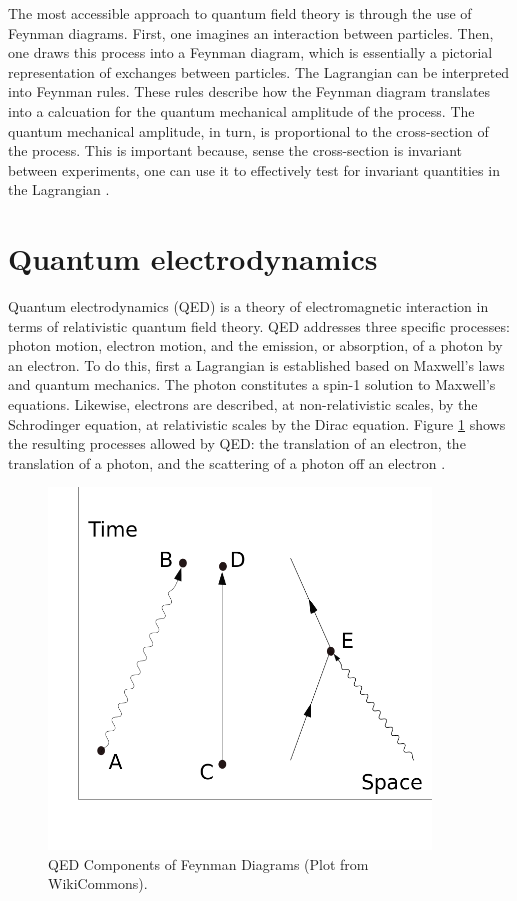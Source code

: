 The most accessible approach to quantum field theory is through the use of Feynman diagrams. First, one imagines an interaction between particles. Then, one draws this process into a Feynman diagram, which is essentially a pictorial representation of exchanges between particles. The Lagrangian can be interpreted into Feynman rules. These rules describe how the Feynman diagram translates into a calcuation for the quantum mechanical amplitude of the process. The quantum mechanical amplitude, in turn, is proportional to the cross-section of the process. This is important because, sense the cross-section is invariant between experiments, one can use it to effectively test for invariant quantities in the Lagrangian \cite{Peskin:1995ev}.

\section{Quantum electrodynamics}

Quantum electrodynamics (QED) is a theory of electromagnetic interaction in terms of relativistic quantum field theory. QED addresses three specific processes: photon motion, electron motion, and the emission, or absorption, of a photon by an electron. To do this, first a Lagrangian is established based on Maxwell's laws and quantum mechanics. The photon constitutes a spin-1 solution to Maxwell's equations. Likewise, electrons are described, at non-relativistic scales, by the Schrodinger equation, at relativistic scales by the Dirac equation. Figure \ref{fig:qedFeynman} shows the resulting processes allowed by QED: the translation of an electron, the translation of a photon, and the scattering of a photon off an electron \cite{Griffiths:2008zz}.

\begin{figure}[h!]
\begin{centering}
\includegraphics[width=4in]{Chapter1/importfigs/Feynman_Diagram_Components.png}
\par\end{centering}
\caption{QED Components of Feynman Diagrams (Plot from WikiCommons). \label{fig:qedFeynman}}
\end{figure}

